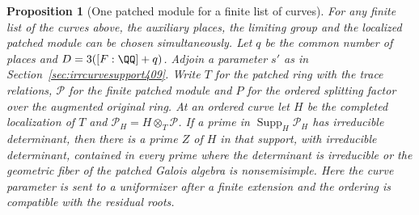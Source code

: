 \documentclass[a4paper,11pt]{article}
\newtheorem{proposition}{Proposition}[section]
\theoremstyle{definition}
\theoremstyle{remark}
\numberwithin{equation}{section}
\begin{document}
\begin{proposition}[One patched module for a finite list of curves]\leavevmode
\label{prop:jointpatch417}
For any finite list of the curves above, the auxiliary places,
the limiting group and the localized patched module can be
chosen simultaneously. Let \(q\) be the common number of
places and \(D=3([F:\QQ]+q)\). Adjoin a parameter \(s'\) as
in Section~\ref{sec:irrcurvesupport409}. Write \(T\) for the
patched ring with the trace relations, \(\mathcal P\) for the
finite patched module and \(P\) for the ordered splitting
factor over the augmented original ring. At an ordered curve
let \(H\) be the completed localization of \(T\) and
\(\mathcal P_H=H\otimes_T\mathcal P\).
If a prime in \(\operatorname{Supp}_H\mathcal P_H\) has
irreducible determinant, then there is a prime \(Z\) of \(H\)
in that support, with irreducible determinant, contained in
every prime where the determinant is irreducible or the
geometric fiber of the patched Galois algebra is nonsemisimple.
Here the curve parameter is sent to a uniformizer after a
finite extension and the ordering is compatible with the
residual roots.
\end{proposition}
\end{document}
